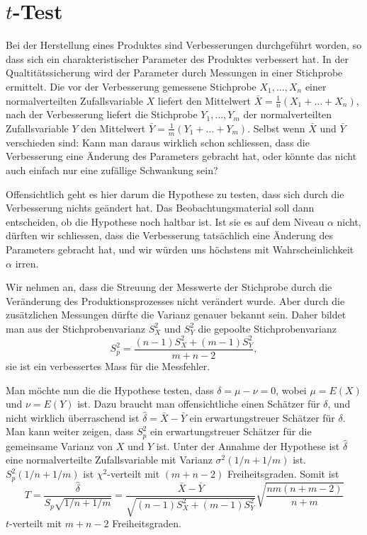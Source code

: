 \section{\texorpdfstring{$t$}{t}-Test}
\label{section-t-test}
Bei der Herstellung eines Produktes sind Verbesserungen durchgeführt worden,
so dass sich ein charakteristischer Parameter des Produktes verbessert hat.
In der Qualtitätssicherung wird der Parameter durch Messungen in einer
Stichprobe ermittelt.
Die vor der Verbesserung gemessene Stichprobe
$X_1,\dots,X_n$
einer normalverteilten Zufallsvariable $X$ liefert den Mittelwert
$\bar X=\frac1n(X_1+\dots+X_n)$, nach
der Verbesserung liefert die Stichprobe $Y_1,\dots,Y_m$ der normalverteilten
Zufallsvariable $Y$ den Mittelwert
$\bar Y=\frac1m(Y_1+\dots+Y_m)$.
Selbst wenn $\bar X$ und $\bar Y$
verschieden sind: Kann man daraus wirklich schon schliessen, dass die
Verbesserung eine Änderung des Parameters gebracht hat, oder könnte
das nicht auch einfach nur eine zufällige Schwankung sein?

Offensichtlich geht es hier darum die Hypothese zu testen, dass sich
durch die Verbesserung nichts geändert hat.
Das Beobachtungsmaterial
soll dann entscheiden, ob die Hypothese noch haltbar ist.
Ist sie es
auf dem Niveau $\alpha$ nicht,
dürften wir schliessen, dass die Verbesserung tatsächlich eine Änderung
des Parameters gebracht hat, und wir würden uns höchstens mit 
Wahrscheinlichkeit $\alpha$ irren.

Wir nehmen an, dass die Streuung der Messwerte der Stichprobe durch die
Veränderung des Produktionsprozesses nicht verändert wurde.
Aber durch
die zusätzlichen Messungen dürfte die Varianz genauer bekannt sein.
Daher bildet man aus der Stichprobenvarianz $S_X^2$ und $S_Y^2$
die gepoolte Stichprobenvarianz
\begin{equation}
S_p^2=\frac{(n-1)S_X^2+(m-1)S_Y^2}{m+n-2},
\label{pooled-variance}
\end{equation}
sie ist ein verbessertes Mass für die Messfehler.

Man möchte nun die die Hypothese testen, dass $\delta=\mu-\nu=0$, wobei
$\mu=E(X)$ und $\nu=E(Y)$ ist.
Dazu braucht man offensichtliche einen
Schätzer für $\delta$, und nicht wirklich überraschend ist
$\hat\delta=\bar X-\bar Y$ ein erwartungstreuer Schätzer für $\delta$.
Man kann weiter zeigen, dass $S_p^2$ ein erwartungstreuer Schätzer
für die gemeinsame Varianz von $X$ und $Y$ ist.
Unter der Annahme der
Hypothese ist $\hat\delta$ eine normalverteilte Zufallsvariable
mit Varianz $\sigma^2(1/n+1/m)$ ist.
$S_p^2(1/n+1/m)$ ist $\chi^2$-verteilt
mit $(m+n-2)$ Freiheitsgraden.
Somit ist 
\begin{equation}
T=\frac{\hat\delta}{S_p\sqrt{1/n+1/m}}
=\frac{\bar X-\bar Y}{\sqrt{(n-1)S_X^2+(m-1)S_Y^2}}\sqrt{\frac{nm(n+m-2)}{n+m}}
\label{t-test-ausdruck}
\end{equation}
$t$-verteilt mit $m+n-2$ Freiheitsgraden.

